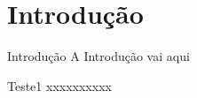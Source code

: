 \section{Introdução}
\begin{frame}{Introdução}
	A Introdução vai aqui
\end{frame}
\begin{frame}{Teste1}
xxxxxxxxxx    
\end{frame}